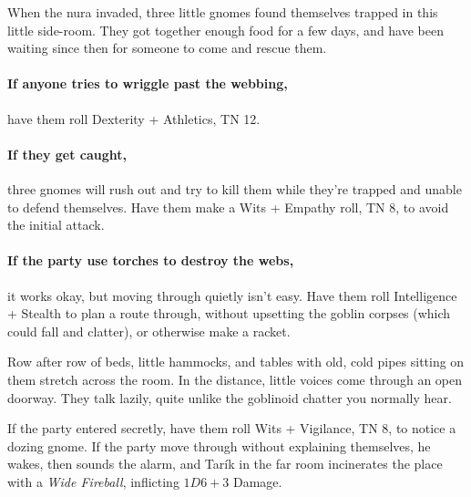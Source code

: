 \begin{multicols}{2}
\begin{boxtext}
\end{boxtext}

\begin{exampletext}

	When the nura invaded, three little gnomes found themselves trapped in this little side-room.
	They got together enough food for a few days, and have been waiting since then for someone to come and rescue them.

\end{exampletext}

\paragraph{If anyone tries to wriggle past the webbing,}
have them roll Dexterity + Athletics, TN 12.

\paragraph{If they get caught,}
three gnomes will rush out and try to kill them while they're trapped and unable to defend themselves.
Have them make a Wits + Empathy roll, TN 8, to avoid the initial attack.

\paragraph{If the party use torches to destroy the webs,}
it works okay, but moving through quietly isn't easy.
Have them roll Intelligence + Stealth to plan a route through, without upsetting the goblin corpses (which could fall and clatter), or otherwise make a racket.


\begin{boxtext}

	Row after row of beds, little hammocks, and tables with old, cold pipes sitting on them stretch across the room.
	In the distance, little voices come through an open doorway.
	They talk lazily, quite unlike the goblinoid chatter you normally hear.

\end{boxtext}

If the party entered secretly, have them roll Wits + Vigilance, TN 8, to notice a dozing gnome.
If the party move through without explaining themselves, he wakes, then sounds the alarm, and Tar\'ik in the far room incinerates the place with a \textit{Wide Fireball}, inflicting $1D6 +3$ Damage.


\end{multicols}
